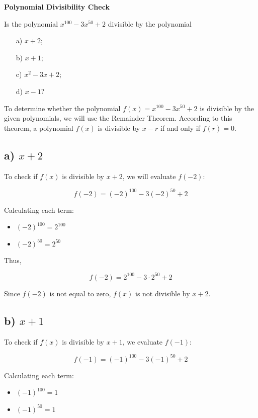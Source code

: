 \documentclass{article}
\begin{document}
\textbf{Polynomial Divisibility Check}

Is the polynomial \( x^{100} - 3x^{50} + 2 \) divisible by the polynomial
\begin{itemize}
    \item[a)] \( x + 2 \);
    \item[b)] \( x + 1 \);
    \item[c)] \( x^2 - 3x + 2 \);
    \item[d)] \( x - 1 \)?
\end{itemize}

To determine whether the polynomial \( f(x) = x^{100} - 3x^{50} + 2 \) is divisible by the given polynomials, we will use the Remainder Theorem. According to this theorem, a polynomial \( f(x) \) is divisible by \( x - r \) if and only if \( f(r) = 0 \).

\subsection*{a) \( x + 2 \)}

To check if \( f(x) \) is divisible by \( x + 2 \), we will evaluate \( f(-2) \):

\[
f(-2) = (-2)^{100} - 3(-2)^{50} + 2
\]

Calculating each term:
\begin{itemize}
    \item \( (-2)^{100} = 2^{100} \)
    \item \( (-2)^{50} = 2^{50} \)
\end{itemize}

Thus,

\[
f(-2) = 2^{100} - 3 \cdot 2^{50} + 2
\]

Since \( f(-2) \) is not equal to zero, \( f(x) \) is not divisible by \( x + 2 \).

\subsection*{b) \( x + 1 \)}

To check if \( f(x) \) is divisible by \( x + 1 \), we evaluate \( f(-1) \):

\[
f(-1) = (-1)^{100} - 3(-1)^{50} + 2
\]

Calculating each term:
\begin{itemize}
    \item \( (-1)^{100} = 1 \)
    \item \( (-1)^{50} = 1 \)
\end{itemize}
\end{document}
